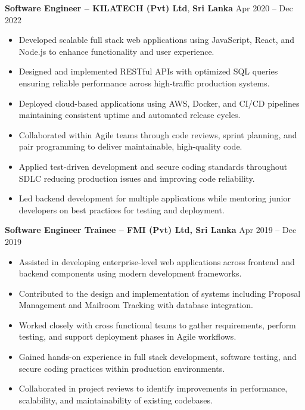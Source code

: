 \documentclass[10pt,letterpaper]{article}
\begin{document}
\vspace{-2pt}

\textbf{Software Engineer -- KILATECH (Pvt) Ltd}, \textbf{Sri Lanka} \hfill Apr 2020 -- Dec 2022

\vspace{-1pt}

\begin{itemize}
\item Developed scalable full stack web applications using JavaScript, React, and Node.js to enhance functionality and user experience.
\item Designed and implemented RESTful APIs with optimized SQL queries ensuring reliable performance across high-traffic production systems.
\item Deployed cloud-based applications using AWS, Docker, and CI/CD pipelines maintaining consistent uptime and automated release cycles.
\item Collaborated within Agile teams through code reviews, sprint planning, and pair programming to deliver maintainable, high-quality code.
\item Applied test-driven development and secure coding standards throughout SDLC reducing production issues and improving code reliability.
\item Led backend development for multiple applications while mentoring junior developers on best practices for testing and deployment.
\end{itemize}

\textbf{Software Engineer Trainee -- FMI (Pvt) Ltd, Sri Lanka} \hfill Apr 2019 -- Dec 2019

\vspace{-1pt}

\begin{itemize}
\item Assisted in developing enterprise-level web applications across frontend and backend components using modern development frameworks.
\item Contributed to the design and implementation of systems including Proposal Management and Mailroom Tracking with database integration.
\item Worked closely with cross functional teams to gather requirements, perform testing, and support deployment phases in Agile workflows.
\item Gained hands-on experience in full stack development, software testing, and secure coding practices within production environments.
\item Collaborated in project reviews to identify improvements in performance, scalability, and maintainability of existing codebases.
\end{itemize}
\end{document}

